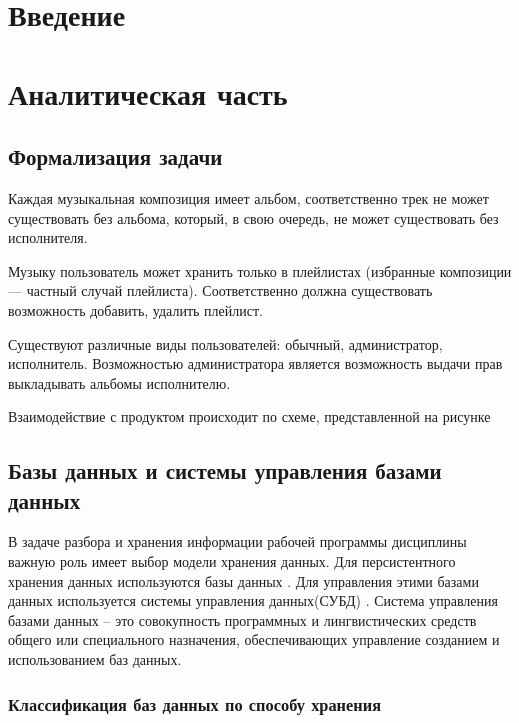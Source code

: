 \documentclass[a4paper,14pt]{extreport}
\begin{document}
\setcounter{page}{2}

\tableofcontents

\chapter*{Введение}



\chapter{Аналитическая часть}\label{anal}

\section{Формализация задачи}

Каждая музыкальная композиция имеет альбом, соответственно трек не может существовать без альбома, который, в свою очередь, не может существовать без исполнителя.

Музыку пользователь может хранить только в плейлистах (избранные композиции --- частный случай плейлиста). Соответственно должна существовать возможность добавить, удалить плейлист. 

Существуют различные виды пользователей: обычный, администратор, исполнитель. Возможностью администратора является возможность выдачи прав выкладывать альбомы исполнителю.

Взаимодействие с продуктом происходит по схеме, представленной на рисунке 

\section{Базы данных и системы управления базами данных}

В задаче разбора и хранения информации рабочей программы дисциплины важную роль имеет выбор модели хранения данных. Для персистентного хранения данных используются базы данных \cite{bib:2}. Для управления этими базами данных используется системы управления данных(СУБД) \cite{bib:3}. Система управления базами данных -- это совокупность программных и лингвистических средств общего или специального назначения, обеспечивающих управление созданием и использованием баз данных.


\subsection{Классификация баз данных по способу хранения}
\end{document}
